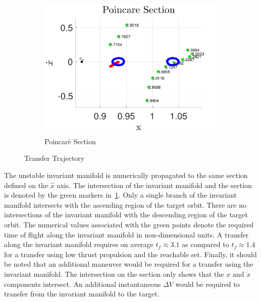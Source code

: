 \documentclass[preprint]{elsarticle}
\begin{document}
\begin{figure}
	\begin{subfigure}[htbp]{0.5\textwidth} 
		\includegraphics[width=\textwidth]{poincare_compare} 
		\caption{Poincar\`e Section} \label{fig:poincare_compare} 
	\end{subfigure} 
	\caption{Transfer Trajectory}
	\label{fig:transfer_orbit} 
\end{figure}

The unstable invariant manifold is numerically propagated to the same \Poincare section defined on the \( \hat{x} \) axis.
The intersection of the invariant manifold and the \Poincare section is denoted by the green markers in~\cref{fig:poincare_compare}.
Only a single branch of the invariant manifold intersects with the ascending region of the target orbit.
There are no intersections of the invariant manifold with the descending region of the target orbit.
The numerical values associated with the green points denote the required time of flight along the invariant manifold in non-dimensional units.
A transfer along the invariant manifold requires on average \( t_f \approx 3.1 \) as compared to \( t_f \approx 1.4 \) for a transfer using low thrust propulsion and the reachable set.
Finally, it should be noted that an additional maneuver would be required for a transfer using the invariant manifold.
The intersection on the \Poincare section only shows that the \( x \text{ and } \dot{x} \) components intersect.
An additional instantaneous \( \Delta V \) would be required to transfer from the invariant manifold to the target.
\end{document}
